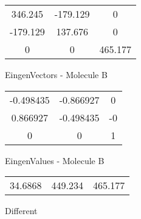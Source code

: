 \begin{multicols}{2}
\begin{center}
\begin{tabular}{|c c c|}
346.245	 & 	-179.129	 & 	0	 \\
-179.129	 & 	137.676	 & 	0	 \\
0	 & 	0	 & 	465.177
\end{tabular}

\vtab
 EingenVectors - Molecule B     \\
\vtab
\begin{tabular}{|c c c|}
-0.498435	 & 	-0.866927	 & 	0	 \\
0.866927	 & 	-0.498435	 & 	-0	 \\
0	 & 	0	 & 	1
\end{tabular}

\vtab
 EingenValues - Molecule B     \\
\vtab
\begin{tabular}{|c c c|}
34.6868	 & 	449.234	 & 	465.177	 \\
\end{tabular}

\end{center}
\end{multicols}
\begin{center}
\vtab
\vtab
\textcolor{NavyBlue}{\Large Different}
\end{center}

 \newpage

